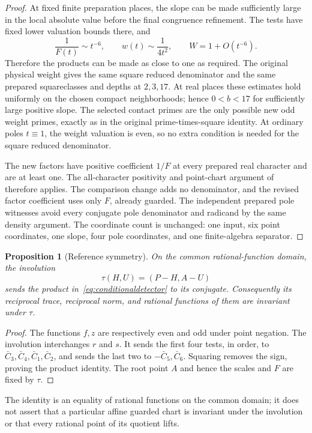 \documentclass[11pt,a4paper]{article}
\newtheorem{proposition}[theorem]{Proposition}
\begin{document}
\begin{proof}
At fixed finite preparation places, the slope can be made sufficiently
large in the local absolute value before the final congruence refinement.
The tests have fixed lower valuation bounds there, and
\[
 \frac1{F(t)}\sim t^{-6},\qquad
 w(t)\sim\frac1{4t^2},\qquad W=1+O(t^{-6}).
\]
Therefore the products can be made as close to one as required. The
original physical weight gives the same square reduced denominator and
the same prepared squareclasses and depths at $2,3,17$. At real places
these estimates hold uniformly on the chosen compact neighborhoods;
hence $0<b<17$ for sufficiently large positive slope. The selected
contact primes are the only possible new odd weight primes, exactly
as in the original prime-times-square identity. At ordinary poles
$t\equiv1$, the weight valuation is even, so no extra condition is
needed for the square reduced denominator.

The new factors have positive coefficient $1/F$ at every prepared real
character and are at least one. The all-character positivity and
point-chart argument of~\cite[Section 5]{Unit} therefore applies.
The comparison change adds no denominator, and the revised factor
coefficient uses only $F$, already guarded. The independent prepared
pole witnesses avoid every conjugate pole denominator and radicand
by the same density argument. The coordinate count is unchanged:
one input, six point coordinates, one slope, four pole coordinates,
and one finite-algebra separator.
\end{proof}

\begin{proposition}[Reference symmetry]\label{prop:symmetry}
On the common rational-function domain, the involution
\[
                         \tau(H,U)=(P-H,A-U)
\]
sends the product in~\eqref{eq:conditionaldetector} to its conjugate.
Consequently its reciprocal trace, reciprocal norm, and rational
functions of them are invariant under $\tau$.
\end{proposition}
\begin{proof}
The functions $f,z$ are respectively even and odd under point negation.
The involution interchanges $r$ and $s$. It sends the first four tests,
in order, to $\bar C_3,\bar C_4,\bar C_1,\bar C_2$, and sends the
last two to $-\bar C_5,\bar C_6$. Squaring removes the sign, proving
the product identity. The root point $A$ and hence the scales and $F$
are fixed by $\tau$.
\end{proof}
The identity is an equality of rational functions on the common domain;
it does not assert that a particular affine guarded chart is invariant
under the involution or that every rational point of its quotient lifts.
\end{document}
